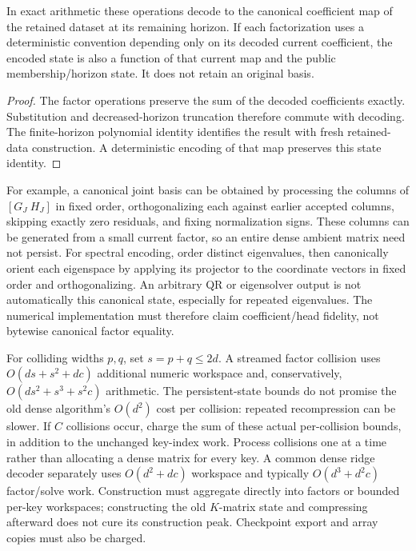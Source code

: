 \begin{proposition}
In exact arithmetic these operations decode to the canonical coefficient
map of the retained dataset at its remaining horizon. If each factorization
uses a deterministic convention depending only on its decoded current
coefficient, the encoded state is also a function of that current map and
the public membership/horizon state. It does not retain an original basis.
\end{proposition}
\begin{proof}
The factor operations preserve the sum of the decoded coefficients exactly.
Substitution and decreased-horizon truncation therefore commute with
decoding. The finite-horizon polynomial identity identifies the result with
fresh retained-data construction. A deterministic encoding of that map
preserves this state identity.
\end{proof}

For example, a canonical joint basis can be obtained by processing the
columns of $[G_J\ H_J]$ in fixed order, orthogonalizing each against earlier
accepted columns, skipping exactly zero residuals, and fixing normalization
signs. These columns can be generated from a small current factor, so an
entire dense ambient matrix need not persist. For spectral encoding, order
distinct eigenvalues, then canonically orient each eigenspace by applying
its projector to the coordinate vectors in fixed order and orthogonalizing.
An arbitrary QR or eigensolver output is not automatically this canonical
state, especially for repeated eigenvalues. The numerical implementation
must therefore claim coefficient/head fidelity, not bytewise canonical
factor equality.

For colliding widths $p,q$, set $s=p+q\le2d$. A streamed factor collision
uses $O(ds+s^2+dc)$ additional numeric workspace and, conservatively,
$O(ds^2+s^3+s^2c)$ arithmetic. The persistent-state bounds do not promise
the old dense algorithm's $O(d^2)$ cost per collision: repeated
recompression can be slower. If $C$ collisions occur, charge the sum of
these actual per-collision bounds, in addition to the unchanged key-index
work. Process collisions one at a time rather than allocating a dense
matrix for every key. A common dense ridge decoder separately uses
$O(d^2+dc)$ workspace and typically $O(d^3+d^2c)$ factor/solve work.
Construction must aggregate directly into factors or bounded per-key
workspaces; constructing the old $K$-matrix state and compressing afterward
does not cure its construction peak. Checkpoint export and array copies
must also be charged.

